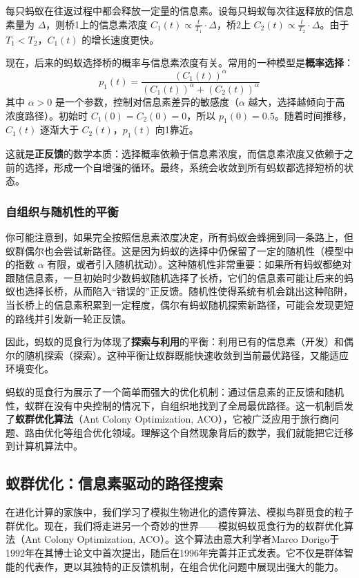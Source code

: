 \documentclass[lang=cn,zihao=-4,a4paper,fontset=windows]{beautybook}
\begin{document}
每只蚂蚁在往返过程中都会释放一定量的信息素。设每只蚂蚁每次往返释放的信息素量为 $\Delta$，则桥1上的信息素浓度 $C_1(t) \propto \frac{t}{T_1} \cdot \Delta$，桥2上 $C_2(t) \propto \frac{t}{T_2} \cdot \Delta$。由于 $T_1 < T_2$，$C_1(t)$ 的增长速度更快。

现在，后来的蚂蚁选择桥的概率与信息素浓度有关。常用的一种模型是\textbf{概率选择}：
\[
p_1(t) = \frac{(C_1(t))^\alpha}{(C_1(t))^\alpha + (C_2(t))^\alpha}
\]
其中 $\alpha > 0$ 是一个参数，控制对信息素差异的敏感度（$\alpha$ 越大，选择越倾向于高浓度路径）。初始时 $C_1(0)=C_2(0)=0$，所以 $p_1(0)=0.5$。随着时间推移，$C_1(t)$ 逐渐大于 $C_2(t)$，$p_1(t)$ 向1靠近。

这就是\textbf{正反馈}的数学本质：选择概率依赖于信息素浓度，而信息素浓度又依赖于之前的选择，形成一个自增强的循环。最终，系统会收敛到所有蚂蚁都选择短桥的状态。

\subsubsection{自组织与随机性的平衡}

你可能注意到，如果完全按照信息素浓度决定，所有蚂蚁会蜂拥到同一条路上，但蚁群偶尔也会尝试新路径。这是因为蚂蚁的选择中仍保留了一定的随机性（模型中的指数 $\alpha$ 有限，或者引入随机扰动）。这种随机性非常重要：如果所有蚂蚁都绝对跟随信息素，一旦初始时少数蚂蚁随机选择了长桥，它们的信息素可能让后来的蚂蚁也选择长桥，从而陷入“错误的”正反馈。随机性使得系统有机会跳出这种陷阱，当长桥上的信息素积累到一定程度，偶尔有蚂蚁随机探索新路径，可能会发现更短的路线并引发新一轮正反馈。

因此，蚂蚁的觅食行为体现了\textbf{探索与利用}的平衡：利用已有的信息素（开发）和偶尔的随机探索（探索）。这种平衡让蚁群既能快速收敛到当前最优路径，又能适应环境变化。

\begin{fancybox}
蚂蚁的觅食行为展示了一个简单而强大的优化机制：通过信息素的正反馈和随机性，蚁群在没有中央控制的情况下，自组织地找到了全局最优路径。这一机制启发了\textbf{蚁群优化算法}（Ant Colony Optimization, ACO），它被广泛应用于旅行商问题、路由优化等组合优化领域。理解这个自然现象背后的数学，我们就能把它迁移到计算机算法中。
\end{fancybox}

\subsection{蚁群优化：信息素驱动的路径搜索}

在进化计算的家族中，我们学习了模拟生物进化的遗传算法、模拟鸟群觅食的粒子群优化。现在，我们将走进另一个奇妙的世界——模拟蚂蚁觅食行为的蚁群优化算法（Ant Colony Optimization, ACO）。这个算法由意大利学者Marco Dorigo于1992年在其博士论文中首次提出，随后在1996年完善并正式发表。它不仅是群体智能的代表作，更以其独特的正反馈机制，在组合优化问题中展现出强大的能力。
\end{document}
